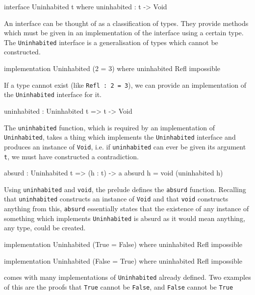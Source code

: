         \begin{code}[caption={The \texttt{Uninhabited} interface}]
        interface Uninhabited t where
            uninhabited : t -> Void
        \end{code}
        
        An interface can be thought of as a classification of types. They provide methods which must be given in an implementation of the interface using a certain type. The \texttt{Uninhabited} interface is a generalisation of types which cannot be constructed.
        
        \begin{code}[caption={2 cannot equal 3}]
        implementation Uninhabited (2 = 3) where
            uninhabited Refl impossible
        \end{code}

        If a type cannot exist (like \texttt{Refl : 2 = 3}), we can provide an implementation of the \texttt{Uninhabited} interface for it.
        
        \begin{code}[caption={The \texttt{uninhabited} function}]
        uninhabited : Uninhabited t => t -> Void
        \end{code}
    
        The \texttt{uninhabited} function, which is required by an implementation of\linebreak
        \texttt{Uninhabited}, takes a thing which implements the \texttt{Uninhabited} interface and produces an instance of \texttt{Void}, i.e. if \texttt{uninhabited} can ever be given its argument \texttt{t}, we must have constructed a contradiction.
        
        \begin{code}[caption={The \texttt{absurd} function}]
        absurd : Uninhabited t => (h : t) -> a
        absurd h = void (uninhabited h)
        \end{code}
        
        Using \texttt{uninhabited} and \texttt{void}, the \Idris prelude defines the \texttt{absurd} function. Recalling that \texttt{uninhabited} constructs an instance of \texttt{Void} and that \texttt{void} constructs anything from this, \texttt{absurd} essentially states that the existence of any instance of something which implements \texttt{Uninhabited} is absurd as it would mean anything, any type, could be created.
        
        \begin{code}[caption={Example pre-defined implementations of \texttt{Uninhabited}}]
        implementation Uninhabited (True = False) where
            uninhabited Refl impossible
        
        implementation Uninhabited (False = True) where
            uninhabited Refl impossible
        \end{code}
        \Idris comes with many implementations of \texttt{Uninhabited} already defined. Two examples of this are the proofs that \texttt{True} cannot be \texttt{False}, and \texttt{False} cannot be \texttt{True}
        
